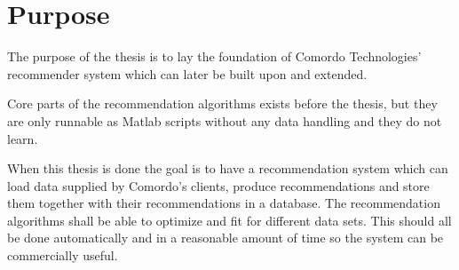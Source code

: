 
\section{Purpose}\label{sec:intro:purpose}

The purpose of the thesis is to lay the foundation of Comordo Technologies' recommender system which can later be built upon and extended.

Core parts of the recommendation algorithms exists before the thesis, but they are only runnable as Matlab scripts without any data handling and they do not learn.

When this thesis is done the goal is to have a recommendation system which can load data supplied by Comordo's clients, produce recommendations and store them together with their recommendations in a database.  The recommendation algorithms shall be able to optimize and fit for different data sets.  This should all be done automatically and in a reasonable amount of time so the system can be commercially useful.

